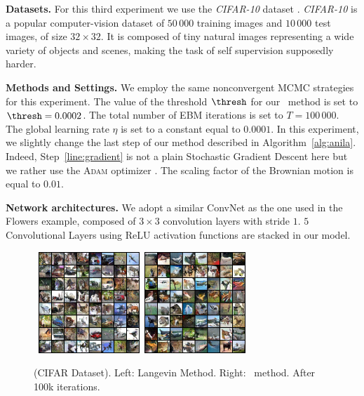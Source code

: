 \documentclass[10pt,twocolumn,letterpaper]{article}
\begin{document}
\textbf{Datasets.}
For this third experiment we use the \textit{CIFAR-10} dataset \cite{krizhevsky2009learning}.
\textit{CIFAR-10}  is a popular computer-vision dataset of $50\,000$ training images and $10\,000$ test images, of size $32\times 32$. 
It is composed of tiny natural images representing a wide variety of objects and scenes, making the task of self supervision supposedly harder.


\medskip
\textbf{Methods and Settings.}
We employ the same nonconvergent MCMC strategies for this experiment.
The value of the threshold $\thresh$ for our \algo\ method is set to $\thresh = 0.0002$.
The total number of EBM iterations is set to $T = 100\,000$.
The global learning rate $\eta$ is set to a constant equal to $0.0001$.
In this experiment, we slightly change the last step of our method described in Algorithm~\ref{alg:anila}.
Indeed, Step~\ref{line:gradient} is not a plain Stochastic Gradient Descent here but we rather use the \textsc{Adam} optimizer \cite{KB15}.
The scaling factor of the Brownian motion is equal to $0.01$.

\medskip
\textbf{Network architectures.} 
We adopt a similar ConvNet as the one used in the Flowers example, composed of $3 \times 3$ convolution layers with stride $1$.
$5$ Convolutional Layers using ReLU activation functions are stacked in our model.



\begin{figure}[H]
\begin{center}
    \mbox{
        \includegraphics[width=1.5in]{figs/cifarlangevin}
        \includegraphics[width=1.5in]{figs/cifaranila}
        }
\end{center}
\caption{(CIFAR Dataset). Left: Langevin Method. Right: \algo\ method. After 100k iterations.}
	\label{fig:cifar}
\end{figure}
\end{document}
